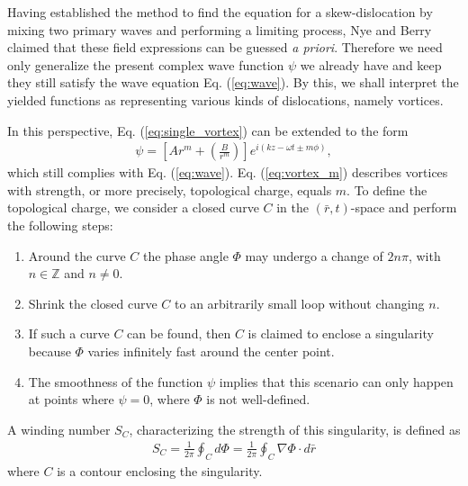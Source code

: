 Having established the method to find the equation for a skew-dislocation by mixing two primary waves and performing a limiting process, Nye and Berry \cite{Ber73} claimed that these field expressions can be guessed \emph{a priori}. Therefore we need only generalize the present complex wave function $\psi$ we already have and keep they still satisfy the wave equation Eq. (\ref{eq:wave}). By this, we shall interpret the yielded functions as representing various kinds of dislocations, namely vortices.

In this perspective, Eq. (\ref{eq:single_vortex}) can be extended to the form
\begin{eqnarray}
	\psi = \left[ Ar^m + \left( \frac{B}{r^m} \right)\right] e^{i(kz - \omega t \pm m \phi)},
	\label{eq:vortex_m}
\end{eqnarray}
which still complies with Eq. (\ref{eq:wave}). Eq. (\ref{eq:vortex_m}) describes vortices with strength, or more precisely, topological charge, equals $m$. To define the topological charge, we consider a closed curve $C$ in the $(\bar{r}, t)$-space and perform the following steps:
\begin{enumerate}
	\item Around the curve $C$ the phase angle $\Phi$ may undergo a change of $2n \pi$, with $n \in \mathbb{Z}$ and $n \neq 0$.
	\item Shrink the closed curve $C$ to an arbitrarily small loop without changing $n$.
	\item If such a curve $C$ can be found, then $C$ is claimed to enclose a singularity because $\Phi$ varies infinitely fast 
	around the center point.
	\item The smoothness of the function $\psi$ implies that this scenario can only happen at points where $\psi = 0$, where $\Phi$ is not well-defined.
\end{enumerate}
A winding number $S_C$, characterizing the strength of this singularity, is defined as 
\begin{eqnarray}
	S_C = \frac{1}{2 \pi} \oint_C d \Phi = \frac{1}{2 \pi} \oint_C \nabla \Phi \cdot d \bar{r}
\end{eqnarray}
where $C$ is a contour enclosing the singularity.

